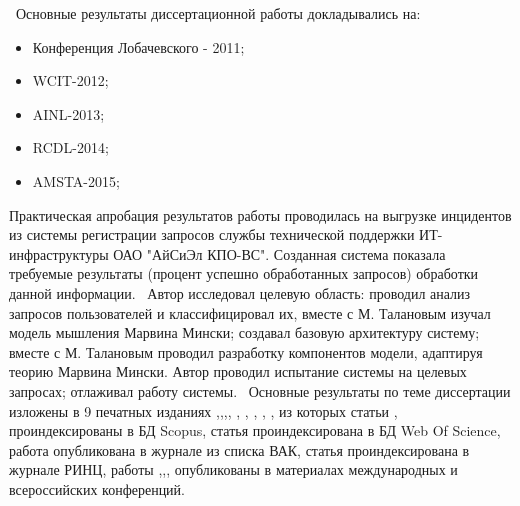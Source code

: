 \probation\
 Основные результаты диссертационной работы докладывались на:
\begin{itemize}
	\item Конференция Лобачевского - 2011;
	\item WCIT-2012;
	\item AINL-2013;
	\item RCDL-2014;
	\item AMSTA-2015;
\end{itemize}
Практическая апробация результатов работы проводилась на выгрузке инцидентов из системы регистрации запросов службы технической поддержки ИТ-инфраструктуры ОАО "АйСиЭл КПО-ВС". Созданная система показала требуемые результаты (процент успешно обработанных запросов) обработки данной информации.
\contribution\ Автор исследовал целевую область: проводил анализ запросов пользователей и классифицировал их, вместе с М. Талановым изучал модель мышления Марвина Мински; создавал базовую архитектуру систему; вместе с М. Талановым проводил разработку компонентов модели, адаптируя теорию Марвина Мински. Автор проводил испытание системы на целевых запросах; отлаживал работу системы.
\publications\ Основные результаты по теме диссертации изложены в 9 печатных изданиях  \cite{Lobachevskii},\cite{WCIT-2012},\cite{AINL-2013},\cite{ISGZ}, \cite{IJSE-1}, \cite{IJSE-2}, \cite{RCDL-2014}, \cite{AMSTA-2015}, \cite{VAK-1}, из которых статьи \cite{RCDL-2014},\cite{AMSTA-2015} проиндексированы в БД Scopus, статья \cite{AMSTA-2015} проиндексирована в БД Web Of Science, работа \cite{VAK-1} опубликована в журнале из списка ВАК, статья  \cite{ISGZ} проиндексирована в журнале РИНЦ, работы \cite{Lobachevskii},\cite{WCIT-2012},\cite{AINL-2013},\cite{ISGZ} опубликованы в материалах международных и всероссийских конференций.



